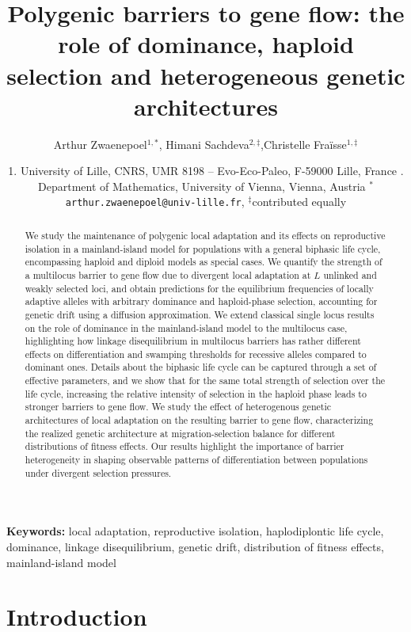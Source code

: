 \documentclass[
  11pt,
]{article}
\title{Polygenic barriers to gene flow: the role of dominance, haploid
selection and heterogeneous genetic architectures}
\author{
Arthur Zwaenepoel\(^{1,\ast}\), Himani
Sachdeva\(^{2,\ddagger}\),Christelle Fraïsse\(^{1,\ddagger}\)
\textsuperscript{}
}
\date{\footnotesize{ 1. University of Lille, CNRS, UMR 8198 --
Evo-Eco-Paleo, F-59000 Lille, France \linebreak  2. Department of
Mathematics, University of Vienna, Vienna,
Austria \linebreak  \(^\ast\)\texttt{arthur.zwaenepoel@univ-lille.fr},
\(^\ddagger\)contributed equally \linebreak }}
\begin{document}
\maketitle
\begin{abstract}
We study the maintenance of polygenic local adaptation and its effects
on reproductive isolation in a mainland-island model for populations
with a general biphasic life cycle, encompassing haploid and diploid
models as special cases. We quantify the strength of a multilocus
barrier to gene flow due to divergent local adaptation at \(L\) unlinked
and weakly selected loci, and obtain predictions for the equilibrium
frequencies of locally adaptive alleles with arbitrary dominance and
haploid-phase selection, accounting for genetic drift using a diffusion
approximation. We extend classical single locus results on the role of
dominance in the mainland-island model to the multilocus case,
highlighting how linkage disequilibrium in multilocus barriers has
rather different effects on differentiation and swamping thresholds for
recessive alleles compared to dominant ones. Details about the biphasic
life cycle can be captured through a set of effective parameters, and we
show that for the same total strength of selection over the life cycle,
increasing the relative intensity of selection in the haploid phase
leads to stronger barriers to gene flow. We study the effect of
heterogenous genetic architectures of local adaptation on the resulting
barrier to gene flow, characterizing the realized genetic architecture
at migration-selection balance for different distributions of fitness
effects. Our results highlight the importance of barrier heterogeneity
in shaping observable patterns of differentiation between populations
under divergent selection pressures.
\end{abstract}
\small
\textbf{Keywords:} local adaptation, reproductive isolation,
haplodiplontic life cycle, dominance, linkage disequilibrium, genetic
drift, distribution of fitness effects, mainland-island model
\normalsize

\hypertarget{sec:intro}{%
\section{Introduction}\label{sec:intro}}
\end{document}
